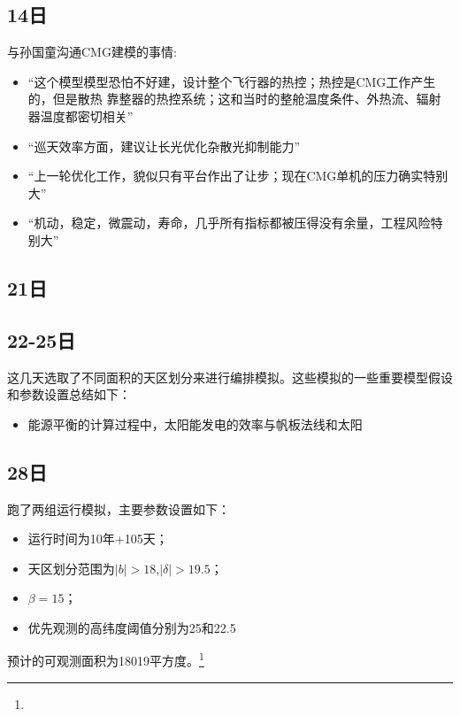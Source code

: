 \subsection{14日}
与孙国童沟通CMG建模的事情:
\begin{itemize}
\item “这个模型模型恐怕不好建，设计整个飞行器的热控；热控是CMG工作产生的，但是散热
靠整器的热控系统；这和当时的整舱温度条件、外热流、辐射器温度都密切相关”

\item “巡天效率方面，建议让长光优化杂散光抑制能力”

\item “上一轮优化工作，貌似只有平台作出了让步；现在CMG单机的压力确实特别大”

\item “机动，稳定，微震动，寿命，几乎所有指标都被压得没有余量，工程风险特别大”
\end{itemize}

\subsection{21日}

\subsection{22-25日}
这几天选取了不同面积的天区划分来进行编排模拟。这些模拟的一些重要模型假设和参数设置总结如下：
\begin{itemize}
\item 能源平衡的计算过程中，太阳能发电的效率与帆板法线和太阳
\end{itemize}


\subsection{28日}
跑了两组运行模拟，主要参数设置如下：
\begin{itemize}
\item 运行时间为10年+105天；
\item 天区划分范围为$|b|>18$\textdegree,$|\delta|>19.5$\textdegree ；
\item $\beta=15$\textdegree ；
\item 优先观测的高纬度阈值分别为25\textdegree 和22.5\textdegree
\end{itemize}
预计的可观测面积为18019平方度。\footnote{}

